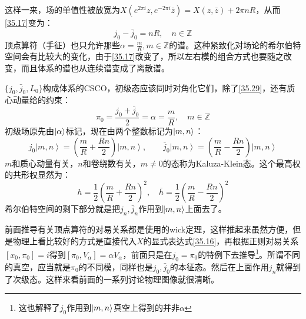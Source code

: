 这样一来，场的单值性被放宽为$X(e^{2\pi i}z,e^{-2\pi i}\bar z)=X(z,\bar z)+2\pi n R$，从而\ref{35.17}变为：
\begin{equation}\label{35.29}
	\boxed{
		j_0-\bar j_0=nR,\quad n\in \mathbb{Z}
	}
\end{equation}
顶点算符（手征）也只允许那些$\alpha=\frac{m}{R},m\in\mathbb{Z}$的谱。这种紧致化对场论的希尔伯特空间会有比较大的变化，由于\ref{35.17}改变了，所以左右模的组合方式也要随之改变，而且体系的谱也从连续谱变成了离散谱。

$\{j_0,\bar j_0,L_0\}$构成体系的CSCO，初级态应该同时对角化它们，除了\ref{35.29}，还有质心动量给的约束：
\begin{equation}
	\boxed{
		\pi_0=\frac{j_0+\bar j_0}{2}=\alpha=\frac{m}{R},\quad m\in\mathbb{Z}
	}
\end{equation}
初级场原先由$\ket{\alpha}$标记，现在由两个整数标记为$\ket{m,n}$：
\begin{equation}
	j_0\left|m,n\right\rangle=\left(\frac mR+\frac{Rn}2\right)\left|m,n\right\rangle,\quad\quad\overline{j}_0\left|m,n\right\rangle=\left(\frac mR-\frac{Rn}2\right)\left|m,n\right\rangle 
\end{equation}
$m$和质心动量有关，$n$和卷绕数有关，$m\neq 0$的态称为Kaluza\mbox{-}Klein态。这个最高权的共形权显然为：
\begin{equation}
	h=\frac{1}{2}\left(\frac mR+\frac{Rn}2\right)^2, \quad \bar h=\frac{1}{2}\left(\frac mR-\frac{Rn}2\right)^2
\end{equation}
希尔伯特空间的剩下部分就是把$j_n,\bar j_n$作用到$\ket{m,n}$上面去了。
\begin{remark}
	前面推导有关顶点算符的对易关系都是使用的wick定理，这样推起来虽然方便，但是物理上看比较好的方式是直接代入$X$的显式表达式\ref{35.16}，再根据正则对易关系$[x_0,\pi_0]=i$得到$[\pi_0,V_\alpha]=\alpha V_\alpha$，前面只是在$j_0=\pi_0$的特例下去推导\footnote{这也解释了$j_0$作用到$\ket{m,n}$真空上得到的并非$\alpha$}。所谓不同的真空，应当就是$\pi_0$的不同模，同样也是$j_0,\bar j_0$的本征态。然后在上面作用$j_n$就得到了次级态。这样来看前面的一系列讨论物理图像就很清晰。
\end{remark}
